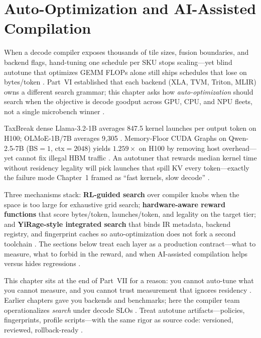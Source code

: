 \chapter{Auto-Optimization and AI-Assisted Compilation}
\label{chap:ch25}

When a decode compiler exposes thousands of tile sizes, fusion boundaries, and backend flags, hand-tuning one schedule per SKU stops scaling---yet blind autotune that optimizes GEMM FLOPs alone still ships schedules that lose on bytes/token \citep{taxbreak2026,memoryfloor2026,patel2025llminference}. Part~VI established that each backend (XLA, TVM, Triton, MLIR) owns a different search grammar; this chapter asks how \emph{auto-optimization} should search when the objective is decode goodput across GPU, CPU, and NPU fleets, not a single microbench winner \citep{chen2020compilerbasedhardw,yirage2026,amd2024xdna,dlbook}.

TaxBreak dense Llama-3.2-1B averages 847.5 kernel launches per output token on H100; OLMoE-1B/7B averages 9,305 \citep{taxbreak2026}. Memory-Floor CUDA Graphs on Qwen-2.5-7B (BS${=}1$, ctx${=}2048$) yields $1.259\times$ on H100 by removing host overhead---yet cannot fix illegal HBM traffic \citep{memoryfloor2026,nvidia2024cudagraphs}. An autotuner that rewards median kernel time without residency legality will pick launches that spill KV every token---exactly the failure mode Chapter~1 framed as ``fast kernels, slow decode'' \citep{patel2025llminference,dao2022flashattention,kwon2023vllm}.

Three mechanisms stack: \textbf{RL-guided search} over compiler knobs when the space is too large for exhaustive grid search; \textbf{hardware-aware reward functions} that score bytes/token, launches/token, and legality on the target tier; and \textbf{YiRage-style integrated search} that binds IR metadata, backend registry, and fingerprint caches so auto-optimization does not fork a second toolchain \citep{yirage2026,chen2020compilerbasedhardw,liu2024deepseekv3}. The sections below treat each layer as a production contract---what to measure, what to forbid in the reward, and when AI-assisted compilation helps versus hides regressions \citep{semianalysis2024tma,amd2024aie,dlbook}.

This chapter sits at the end of Part~VII for a reason: you cannot auto-tune what you cannot measure, and you cannot trust measurement that ignores residency \citep{memoryfloor2026,dao2022flashattention,patel2025llminference}. Earlier chapters gave you backends and benchmarks; here the compiler team operationalizes \emph{search} under decode SLOs \citep{chen2020compilerbasedhardw,taxbreak2026,yirage2026,kwon2023vllm,liu2024deepseekv3,amd2024xdna,amd2024aie,dlbook,semianalysis2024tma,nvidia2024cudagraphs,nvidia2022hopper,dao2023flashdecoding}. Treat autotune artifacts---policies, fingerprints, profile scripts---with the same rigor as source code: versioned, reviewed, rollback-ready \citep{patel2025llminference,yirage2026,memoryfloor2026,chen2020compilerbasedhardw}.

